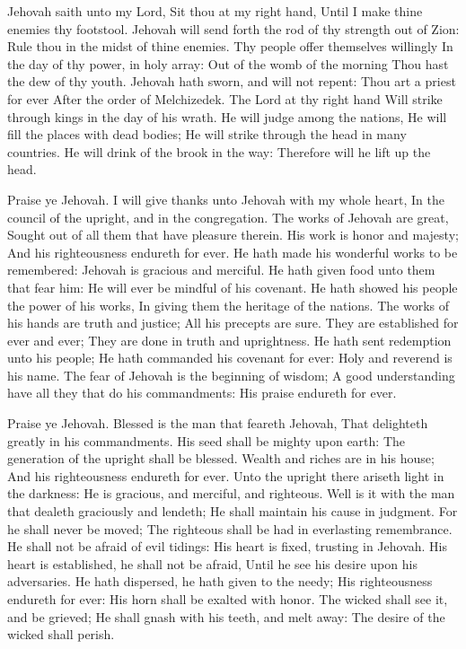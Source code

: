 Jehovah saith unto my Lord, Sit thou at my right hand, Until I make thine enemies thy footstool.  Jehovah will send forth the rod of thy strength out of Zion: Rule thou in the midst of thine enemies.  Thy people offer themselves willingly In the day of thy power, in holy array: Out of the womb of the morning Thou hast the dew of thy youth.  Jehovah hath sworn, and will not repent: Thou art a priest for ever After the order of Melchizedek.  The Lord at thy right hand Will strike through kings in the day of his wrath.  He will judge among the nations, He will fill the places with dead bodies; He will strike through the head in many countries.  He will drink of the brook in the way: Therefore will he lift up the head. 

Praise ye Jehovah. I will give thanks unto Jehovah with my whole heart, In the council of the upright, and in the congregation.  The works of Jehovah are great, Sought out of all them that have pleasure therein.  His work is honor and majesty; And his righteousness endureth for ever.  He hath made his wonderful works to be remembered: Jehovah is gracious and merciful.  He hath given food unto them that fear him: He will ever be mindful of his covenant.  He hath showed his people the power of his works, In giving them the heritage of the nations.  The works of his hands are truth and justice; All his precepts are sure.  They are established for ever and ever; They are done in truth and uprightness.  He hath sent redemption unto his people; He hath commanded his covenant for ever: Holy and reverend is his name.  The fear of Jehovah is the beginning of wisdom; A good understanding have all they that do his commandments: His praise endureth for ever. 

Praise ye Jehovah. Blessed is the man that feareth Jehovah, That delighteth greatly in his commandments.  His seed shall be mighty upon earth: The generation of the upright shall be blessed.  Wealth and riches are in his house; And his righteousness endureth for ever.  Unto the upright there ariseth light in the darkness: He is gracious, and merciful, and righteous.  Well is it with the man that dealeth graciously and lendeth; He shall maintain his cause in judgment.  For he shall never be moved; The righteous shall be had in everlasting remembrance.  He shall not be afraid of evil tidings: His heart is fixed, trusting in Jehovah.  His heart is established, he shall not be afraid, Until he see his desire upon his adversaries.  He hath dispersed, he hath given to the needy; His righteousness endureth for ever: His horn shall be exalted with honor.  The wicked shall see it, and be grieved; He shall gnash with his teeth, and melt away: The desire of the wicked shall perish. 

